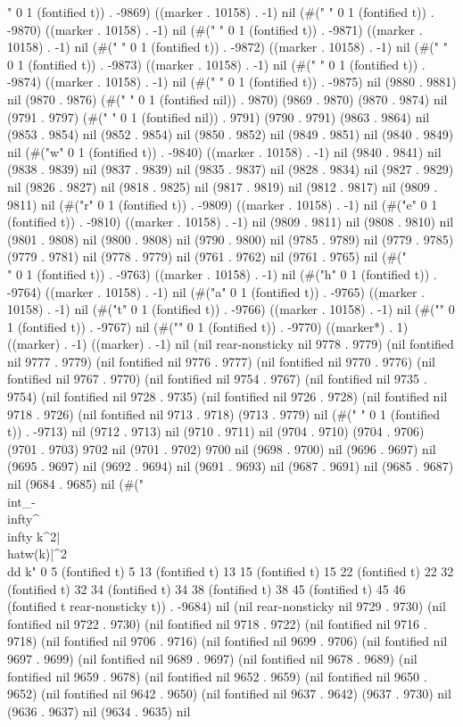 {" 0 1 (fontified t)) . -9869) ((marker . 10158) . -1) nil (#("	" 0 1 (fontified t)) . -9870) ((marker . 10158) . -1) nil (#(" " 0 1 (fontified t)) . -9871) ((marker . 10158) . -1) nil (#(" " 0 1 (fontified t)) . -9872) ((marker . 10158) . -1) nil (#(" " 0 1 (fontified t)) . -9873) ((marker . 10158) . -1) nil (#(" " 0 1 (fontified t)) . -9874) ((marker . 10158) . -1) nil (#(" " 0 1 (fontified t)) . -9875) nil (9880 . 9881) nil (9870 . 9876) (#(" " 0 1 (fontified nil)) . 9870) (9869 . 9870) (9870 . 9874) nil (9791 . 9797) (#(" " 0 1 (fontified nil)) . 9791) (9790 . 9791) (9863 . 9864) nil (9853 . 9854) nil (9852 . 9854) nil (9850 . 9852) nil (9849 . 9851) nil (9840 . 9849) nil (#("w" 0 1 (fontified t)) . -9840) ((marker . 10158) . -1) nil (9840 . 9841) nil (9838 . 9839) nil (9837 . 9839) nil (9835 . 9837) nil (9828 . 9834) nil (9827 . 9829) nil (9826 . 9827) nil (9818 . 9825) nil (9817 . 9819) nil (9812 . 9817) nil (9809 . 9811) nil (#("r" 0 1 (fontified t)) . -9809) ((marker . 10158) . -1) nil (#("e" 0 1 (fontified t)) . -9810) ((marker . 10158) . -1) nil (9809 . 9811) nil (9808 . 9810) nil (9801 . 9808) nil (9800 . 9808) nil (9790 . 9800) nil (9785 . 9789) nil (9779 . 9785) (9779 . 9781) nil (9778 . 9779) nil (9761 . 9762) nil (9761 . 9765) nil (#("\\" 0 1 (fontified t)) . -9763) ((marker . 10158) . -1) nil (#("h" 0 1 (fontified t)) . -9764) ((marker . 10158) . -1) nil (#("a" 0 1 (fontified t)) . -9765) ((marker . 10158) . -1) nil (#("t" 0 1 (fontified t)) . -9766) ((marker . 10158) . -1) nil (#("{" 0 1 (fontified t)) . -9767) nil (#("}" 0 1 (fontified t)) . -9770) ((marker*) . 1) ((marker) . -1) ((marker) . -1) nil (nil rear-nonsticky nil 9778 . 9779) (nil fontified nil 9777 . 9779) (nil fontified nil 9776 . 9777) (nil fontified nil 9770 . 9776) (nil fontified nil 9767 . 9770) (nil fontified nil 9754 . 9767) (nil fontified nil 9735 . 9754) (nil fontified nil 9728 . 9735) (nil fontified nil 9726 . 9728) (nil fontified nil 9718 . 9726) (nil fontified nil 9713 . 9718) (9713 . 9779) nil (#(" " 0 1 (fontified t)) . -9713) nil (9712 . 9713) nil (9710 . 9711) nil (9704 . 9710) (9704 . 9706) (9701 . 9703) 9702 nil (9701 . 9702) 9700 nil (9698 . 9700) nil (9696 . 9697) nil (9695 . 9697) nil (9692 . 9694) nil (9691 . 9693) nil (9687 . 9691) nil (9685 . 9687) nil (9684 . 9685) nil (#("\\int_{-\\infty}^{\\infty} k^2|\\hat{w}(k)|^2\\dd k" 0 5 (fontified t) 5 13 (fontified t) 13 15 (fontified t) 15 22 (fontified t) 22 32 (fontified t) 32 34 (fontified t) 34 38 (fontified t) 38 45 (fontified t) 45 46 (fontified t rear-nonsticky t)) . -9684) nil (nil rear-nonsticky nil 9729 . 9730) (nil fontified nil 9722 . 9730) (nil fontified nil 9718 . 9722) (nil fontified nil 9716 . 9718) (nil fontified nil 9706 . 9716) (nil fontified nil 9699 . 9706) (nil fontified nil 9697 . 9699) (nil fontified nil 9689 . 9697) (nil fontified nil 9678 . 9689) (nil fontified nil 9659 . 9678) (nil fontified nil 9652 . 9659) (nil fontified nil 9650 . 9652) (nil fontified nil 9642 . 9650) (nil fontified nil 9637 . 9642) (9637 . 9730) nil (9636 . 9637) nil (9634 . 9635) nil }
